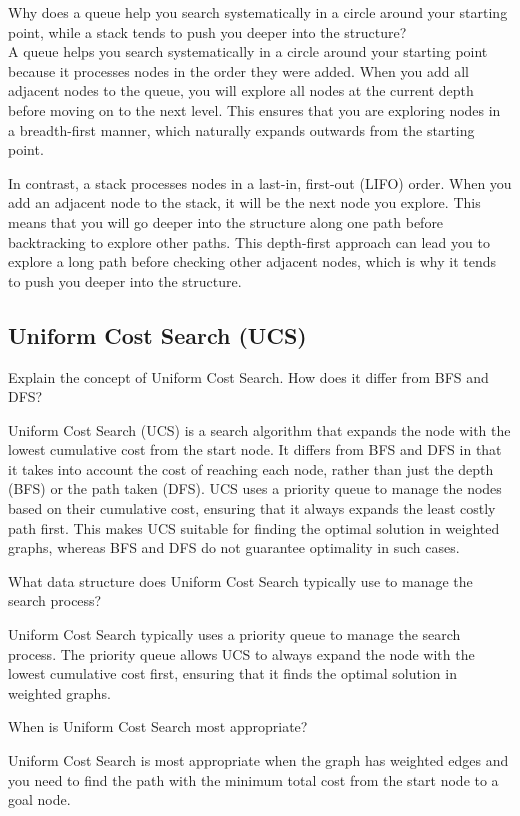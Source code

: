\begin{ejercicio}
    Why does a queue help you search systematically in a circle around your starting point, while a stack tends to push you deeper into the structure?\\

    A queue helps you search systematically in a circle around your starting point because it processes nodes in the order they were added. When you add all adjacent nodes to the queue, you will explore all nodes at the current depth before moving on to the next level. This ensures that you are exploring nodes in a breadth-first manner, which naturally expands outwards from the starting point.

    In contrast, a stack processes nodes in a last-in, first-out (LIFO) order. When you add an adjacent node to the stack, it will be the next node you explore. This means that you will go deeper into the structure along one path before backtracking to explore other paths. This depth-first approach can lead you to explore a long path before checking other adjacent nodes, which is why it tends to push you deeper into the structure.
\end{ejercicio}



\subsection*{Uniform Cost Search (UCS)}

\begin{ejercicio}
    Explain the concept of Uniform Cost Search. How does it differ from BFS and DFS?

    Uniform Cost Search (UCS) is a search algorithm that expands the node with the lowest cumulative cost from the start node. It differs from BFS and DFS in that it takes into account the cost of reaching each node, rather than just the depth (BFS) or the path taken (DFS). UCS uses a priority queue to manage the nodes based on their cumulative cost, ensuring that it always expands the least costly path first. This makes UCS suitable for finding the optimal solution in weighted graphs, whereas BFS and DFS do not guarantee optimality in such cases.
\end{ejercicio}
\begin{ejercicio}
    What data structure does Uniform Cost Search typically use to manage the search process?

    Uniform Cost Search typically uses a priority queue to manage the search process. The priority queue allows UCS to always expand the node with the lowest cumulative cost first, ensuring that it finds the optimal solution in weighted graphs.
\end{ejercicio}
\begin{ejercicio}
    When is Uniform Cost Search most appropriate?
    
    Uniform Cost Search is most appropriate when the graph has weighted edges and you need to find the path with the minimum total cost from the start node to a goal node.
\end{ejercicio}


